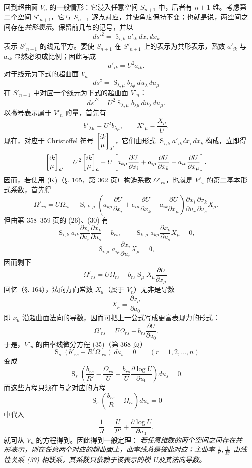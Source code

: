 回到超曲面 \(V_n\) 的一般情形：它浸入任意空间 \(S_{n+1}\) 中，后者有 \(n+1\) 维。考虑第二个空间 \(S'_{n+1}\)，它与 \(S_{n+1}\) 逐点对应，并使角度保持不变；也就是说，两空间之间存在\emph{共形表示}。保留前几节的记号，并以
\[
 ds'^2=\mathop{\mathrm{S}}_{i,k}a'_{ik}\,dx_i\,dx_k
\]
表示 \(S'_{n+1}\) 的线元平方。要使 \(S_{n+1}\) 在 \(S'_{n+1}\) 上的表示为共形表示，系数 \(a'_{ik}\) 与 \(a_{ik}\) 显然必须成比例；因此写成
\[
 a'_{ik}=U^2a_{ik}.
\]
对于线元为下式的超曲面 \(V_n\)
\[
 ds^2=\mathop{\mathrm{S}}_{\lambda,\mu}b_{\lambda\mu}\,du_\lambda\,du_\mu
\]
在 \(S'_{n+1}\) 中对应一个线元为下式的超曲面 \(V'_n\)：
\[
 ds'^2=U^2\mathop{\mathrm{S}}_{\lambda,\mu}b_{\lambda\mu}\,du_\lambda\,du_\mu.
\]
以撇号表示属于 \(V'_n\) 的量，首先有
\[
 b'_{\lambda\mu}=U^2b_{\lambda\mu},\qquad X'_\mu=\frac{X_\mu}{U}.
\]
现在，对应于 Christoffel 符号 \(\left[\begin{matrix}ik\\\mu\end{matrix}\right]_{a'}\)，它们由形式 \(\mathop{\mathrm{S}}_{i,k}a'_{ik}dx_i\,dx_k\) 构成，立即得
\[
 \left[\begin{matrix}ik\\\mu\end{matrix}\right]_{a'}=
 U^2\left[\begin{matrix}ik\\\mu\end{matrix}\right]_{a}
 +U\left[
 a_{k\mu}\frac{\partial U}{\partial x_i}
 +a_{i\mu}\frac{\partial U}{\partial x_k}
 -a_{ik}\frac{\partial U}{\partial x_\mu}
 \right].
\]
因而，若使用 (K)（\S. 165，第 362 页）构造系数 \(\Omega'_{rs}\)，也就是 \(V'_n\) 的第二基本形式系数，首先得
\[
 \Omega'_{rs}=U\Omega_{rs}+
 \mathop{\mathrm{S}}_{i,k,\mu}\left(a_{k\mu}\frac{\partial U}{\partial x_i}
+a_{i\mu}\frac{\partial U}{\partial x_k}
-a_{ik}\frac{\partial U}{\partial x_\mu}\right)
\frac{\partial x_i}{\partial u_r}\frac{\partial x_k}{\partial u_s}X_\mu.
\]
但由第 358--359 页的 (26)、(30) 有
\[
 \mathop{\mathrm{S}}_{i,k}a_{ik}\frac{\partial x_i}{\partial u_r}\frac{\partial x_k}{\partial u_s}=b_{rs},\qquad
 \mathop{\mathrm{S}}_{k,\mu}a_{k\mu}\frac{\partial x_k}{\partial u_s}X_\mu=0,
\]
\[
 \mathop{\mathrm{S}}_{i,\mu}a_{i\mu}\frac{\partial x_i}{\partial u_r}X_\mu=0,
\]
因而剩下
\[
 \Omega'_{rs}=U\Omega_{rs}-b_{rs}\mathop{\mathrm{S}}_\mu X_\mu\frac{\partial U}{\partial x_\mu}.
\]
回忆（\S. 164），法向方向常数 \(X_\mu\)（属于 \(V_n\)）无非是导数
\[
 X_\mu=\frac{\partial x_\mu}{\partial u_0}
\]
即 \(x_\mu\) 沿超曲面法向的导数，因而可把上一公式写成更富表现力的形式：
\[
\tag{38}
 \Omega'_{rs}=U\Omega_{rs}-b_{rs}\frac{\partial U}{\partial u_0}.
\]
于是，\(V'_n\) 的曲率线微分方程 (35)（第 368 页）
\[
 \mathop{\mathrm{S}}_s(b'_{rs}-R'\Omega'_{rs})\,du_s=0\qquad (r=1,2,\ldots,n)
\]
变成
\[
 \mathop{\mathrm{S}}_s\left(\frac{b_{rs}}{R'}-\frac{\Omega_{rs}}{U}
+\frac{b_{rs}}{U}\frac{\partial\log U}{\partial u_0}\right)du_s=0.
\]
而这些方程只须在与之对应的方程
\[
 \mathop{\mathrm{S}}_s\left(\frac{b_{rs}}R-\Omega_{rs}\right)du_s=0
\]
中代入
\[
\tag{39}
 \frac1R=\frac{U}{R'}+\frac{\partial\log U}{\partial u_0}.
\]
就可从 \(V_n\) 的方程得到。因此得到一般定理：
\emph{若任意维数的两个空间之间存在共形表示，则在任意两个对应的超曲面上，曲率线总是彼此对应；主曲率 \(\frac1R,\frac1{R'}\) 由线性关系 (39) 相联系，其系数只依赖于该表示的模 U及其法向导数。}

